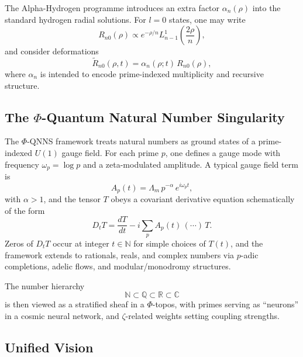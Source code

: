 \documentclass[11pt]{article}
\begin{document}
The Alpha-Hydrogen programme introduces an extra factor
$\alpha_n(\rho)$ into the standard hydrogen radial solutions. For
$l=0$ states, one may write
\[
  R_{n0}(\rho)
    \propto e^{-\rho/n}
    L^{1}_{n-1}\!\left(\frac{2\rho}{n}\right),
\]
and consider deformations
\[
  \tilde R_{n0}(\rho,t)
    = \alpha_n(\rho;t)\,R_{n0}(\rho),
\]
where $\alpha_n$ is intended to encode prime-indexed multiplicity and
recursive structure.

\subsection{The $\Phi$-Quantum Natural Number Singularity}

The $\Phi$-QNNS framework treats natural numbers as ground states of a
prime-indexed $U(1)$ gauge field. For each prime $p$, one defines a
gauge mode with frequency $\omega_p = \log p$ and a zeta-modulated
amplitude. A typical gauge field term is
\[
  A_p(t)
    = \Lambda_m\,p^{-\alpha}\,e^{i\omega_p t},
\]
with $\alpha > 1$, and the tensor $T$ obeys a covariant derivative
equation schematically of the form
\[
  D_t T = \frac{dT}{dt} - i \sum_p A_p(t)\,(\cdots)\,T.
\]
Zeros of $D_t T$ occur at integer $t \in \mathbb{N}$ for simple
choices of $T(t)$, and the framework extends to rationals,
reals, and complex numbers via $p$-adic completions, adelic flows, and
modular/monodromy structures.

The number hierarchy
\[
  \mathbb{N} \subset \mathbb{Q} \subset \mathbb{R} \subset \mathbb{C}
\]
is then viewed as a stratified sheaf in a $\Phi$-topos, with primes
serving as ``neurons'' in a cosmic neural network, and $\zeta$-related
weights setting coupling strengths.

\subsection{Unified Vision}
\end{document}
